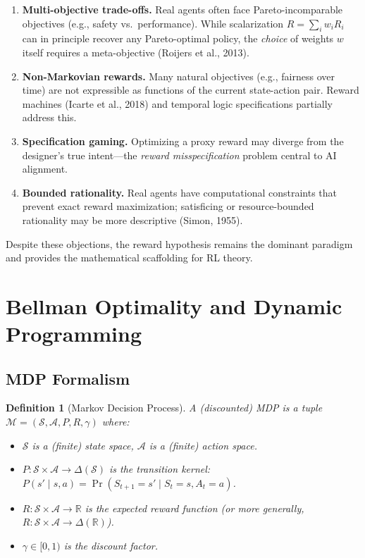 \documentclass[11pt,a4paper]{article}
\newtheorem{definition}[theorem]{Definition}
\newcommand{\R}{\mathbb{R}}
\newcommand{\cS}{\mathcal{S}}
\newcommand{\cA}{\mathcal{A}}
\newcommand{\cM}{\mathcal{M}}
\begin{document}
\begin{enumerate}[label=(\roman*)]
  \item \textbf{Multi-objective trade-offs.} Real agents often face Pareto-incomparable
    objectives (e.g., safety vs.\ performance). While scalarization
    $R = \sum_i w_i R_i$ can in principle recover any Pareto-optimal policy, the
    \emph{choice} of weights $w$ itself requires a meta-objective
    (Roijers et al., 2013).
  \item \textbf{Non-Markovian rewards.} Many natural objectives (e.g., fairness
    over time) are not expressible as functions of the current state-action pair.
    Reward machines (Icarte et al., 2018) and temporal logic specifications
    partially address this.
  \item \textbf{Specification gaming.} Optimizing a proxy reward may diverge
    from the designer's true intent---the \emph{reward misspecification} problem
    central to AI alignment.
  \item \textbf{Bounded rationality.} Real agents have computational constraints
    that prevent exact reward maximization; satisficing or resource-bounded
    rationality may be more descriptive (Simon, 1955).
\end{enumerate}

Despite these objections, the reward hypothesis remains the dominant
paradigm and provides the mathematical scaffolding for RL theory.


\section{Bellman Optimality and Dynamic Programming}
\label{sec:bellman}

\subsection{MDP Formalism}

\begin{definition}[Markov Decision Process]
A (discounted) MDP is a tuple $\cM = (\cS, \cA, P, R, \gamma)$ where:
\begin{itemize}[nosep]
  \item $\cS$ is a (finite) state space, $\cA$ is a (finite) action space.
  \item $P : \cS \times \cA \to \Delta(\cS)$ is the transition kernel:
    $P(s' \mid s, a) = \Pr(S_{t+1} = s' \mid S_t = s, A_t = a)$.
  \item $R : \cS \times \cA \to \R$ is the expected reward function (or more
    generally, $R : \cS \times \cA \to \Delta(\R)$).
  \item $\gamma \in [0, 1)$ is the discount factor.
\end{itemize}
\end{definition}
\end{document}
